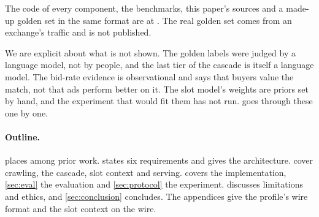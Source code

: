 The code of every component, the benchmarks, this paper's sources and a made-up golden set in the same format are at \repo. The real golden set comes from an exchange's traffic and is not published.

We are explicit about what is not shown. The golden labels were judged by a language model, not by people, and the last tier of the cascade is itself a language model. The bid-rate evidence is observational and says that buyers value the match, not that ads perform better on it. The slot model's weights are priors set by hand, and the experiment that would fit them has not run.  goes through these one by one.

\paragraph{Outline.}  places \sys{} among prior work.  states six requirements and gives the architecture.  cover crawling, the cascade, slot context and serving.  covers the implementation, \cref{sec:eval} the evaluation and \cref{sec:protocol} the experiment.  discusses limitations and ethics, and \cref{sec:conclusion} concludes. The appendices give the profile's wire format and the slot context on the wire.
